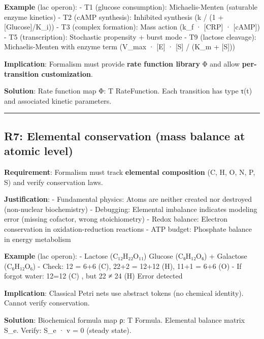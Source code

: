 \textbf{Example} (lac operon): - T1 (glucose consumption):
Michaelis-Menten (saturable enzyme kinetics) - T2 (cAMP synthesis):
Inhibited synthesis (k / (1 + {[}Glucose{]}/K\_i)) - T3 (complex
formation): Mass action (k\_f · {[}CRP{]} · {[}cAMP{]}) - T5
(transcription): Stochastic propensity + burst mode - T9 (lactose
cleavage): Michaelis-Menten with enzyme term (V\_max · {[}E{]} · {[}S{]}
/ (K\_m + {[}S{]}))

\textbf{Implication}: Formalism must provide \textbf{rate function
library} Φ and allow \textbf{per-transition customization}.

\textbf{Solution}: Rate function map Φ: T \textrightarrow RateFunction. Each
transition has type τ(t) and associated kinetic parameters.

\begin{center}\rule{0.5\linewidth}{0.5pt}\end{center}

\hypertarget{r7-elemental-conservation-mass-balance-at-atomic-level}{%
\subsection{\texorpdfstring{\textbf{R7: Elemental conservation} (mass
balance at atomic
level)}{R7: Elemental conservation (mass balance at atomic level)}}\label{r7-elemental-conservation-mass-balance-at-atomic-level}}

\textbf{Requirement}: Formalism must track \textbf{elemental
composition} (C, H, O, N, P, S) and verify conservation laws.

\textbf{Justification}: - Fundamental physics: Atoms are neither created
nor destroyed (non-nuclear biochemistry) - Debugging: Elemental
imbalance indicates modeling error (missing cofactor, wrong
stoichiometry) - Redox balance: Electron conservation in
oxidation-reduction reactions - ATP budget: Phosphate balance in energy
metabolism

\textbf{Example} (lac operon): - Lactose (C₁₂H₂₂O₁₁) \textrightarrow Glucose (C₆H₁₂O₆)
+ Galactose (C₆H₁₂O₆) - Check: 12 = 6+6 (C), 22+2 = 12+12 (H), 11+1 =
6+6 (O) \checkmark - If forgot water: 12=12 (C) \checkmark, but 22 ≠ 24 (H) \texttimes \textrightarrow Error
detected

\textbf{Implication}: Classical Petri nets use abstract tokens (no
chemical identity). Cannot verify conservation.

\textbf{Solution}: Biochemical formula map ρ: T \textrightarrow Formula. Elemental
balance matrix S\_e. Verify: S\_e · v = 0 (steady state).

